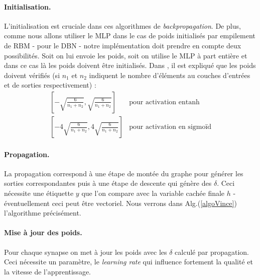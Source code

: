 \documentclass[10pt,a4paper]{article}
\begin{document}
\paragraph{Initialisation. }L'initialisation est cruciale dans ces algorithmes de \emph{backpropagation}. De plus, comme nous allons utiliser le MLP dans le cas de poids initialisés par empilement de RBM - pour le DBN - notre implémentation doit prendre en compte deux possibilités. Soit on lui envoie les poids, soit on utilise le MLP à part entière et dans ce cas là les poids doivent être initialisés. Dans \cite{GlorotAISTATS2010}, il est expliqué que les poids doivent vérifiés (si $n_1$ et $ n_2$ indiquent le nombre d'éléments au couches d'entrées et de sorties respectivement) : 
\begin{equation}
\begin{array}{ll}
\displaystyle \left[ - \sqrt{\frac{6}{n_1+n_2}} , \sqrt{\frac{6}{n_1+n_2}}\right] & \text{pour activation en} \tanh \\
\displaystyle \left[ - 4\sqrt{\frac{6}{n_1+n_2}} , 4\sqrt{\frac{6}{n_1+n_2}}\right] & \text{pour activation en sigmoïd} 
\end{array}
\end{equation}


\paragraph{Propagation. }La propagation correspond à une étape de montée du graphe pour générer les sorties correspondantes puis à une étape de descente qui génère des $\delta$. Ceci nécessite une étiquette $y$ que l'on compare avec la variable cachée finale $h$ - éventuellement ceci peut être vectoriel. Nous verrons dans Alg.(\ref{algoVince}) l'algorithme précisément. 

\paragraph{Mise à jour des poids. }Pour chaque synapse on met à jour les poids avec les $\delta$ calculé par propagation. Ceci nécessite un paramètre, le \emph{learning rate} qui influence fortement la qualité et la vitesse de l'apprentissage. \\
\end{document}
